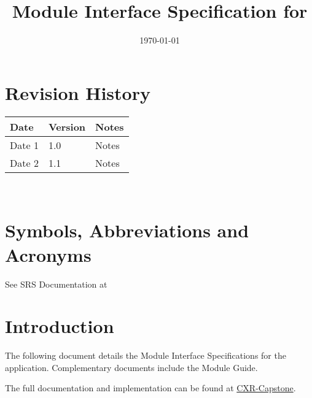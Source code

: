 \documentclass[12pt, titlepage]{article}
\begin{document}
\title{Module Interface Specification for \progname{}}

\author{\authname}

\date{\today}

\maketitle


\section{Revision History}

\begin{tabularx}{\textwidth}{p{3cm}p{2cm}X}
\toprule {\bf Date} & {\bf Version} & {\bf Notes}\\
\midrule
Date 1 & 1.0 & Notes\\
Date 2 & 1.1 & Notes\\
\bottomrule
\end{tabularx}

~\newpage

\section{Symbols, Abbreviations and Acronyms}

See SRS Documentation at 


\newpage

\tableofcontents

\newpage


\section{Introduction}

The following document details the Module Interface Specifications for the
 application. Complementary documents include the Module Guide.

The full documentation and implementation can be found at \href{https://github.com/RezaJodeiri/CXR-Capstone}{CXR-Capstone}.
\end{document}
